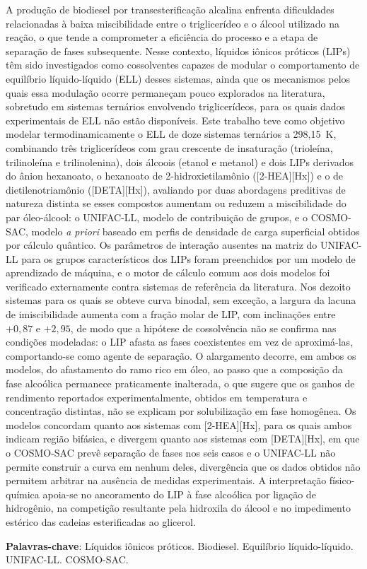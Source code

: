 \setlength{\absparsep}{18pt} %
\begin{resumo}
 
A produção de biodiesel por transesterificação alcalina enfrenta dificuldades relacionadas à baixa miscibilidade entre o triglicerídeo e o álcool utilizado na reação, o que tende a comprometer a eficiência do processo e a etapa de separação de fases subsequente. Nesse contexto, líquidos iônicos próticos (LIPs) têm sido investigados como cossolventes capazes de modular o comportamento de equilíbrio líquido-líquido (ELL) desses sistemas, ainda que os mecanismos pelos quais essa modulação ocorre permaneçam pouco explorados na literatura, sobretudo em sistemas ternários envolvendo triglicerídeos, para os quais dados experimentais de ELL não estão disponíveis. Este trabalho teve como objetivo modelar termodinamicamente o ELL de doze sistemas ternários a 298,15~K, combinando três triglicerídeos com grau crescente de insaturação (trioleína, trilinoleína e trilinolenina), dois álcoois (etanol e metanol) e dois LIPs derivados do ânion hexanoato, o hexanoato de 2-hidroxietilamônio ([2-HEA][Hx]) e o de dietilenotriamônio ([DETA][Hx]), avaliando por duas abordagens preditivas de natureza distinta se esses compostos aumentam ou reduzem a miscibilidade do par óleo-álcool: o UNIFAC-LL, modelo de contribuição de grupos, e o COSMO-SAC, modelo \textit{a priori} baseado em perfis de densidade de carga superficial obtidos por cálculo quântico. Os parâmetros de interação ausentes na matriz do UNIFAC-LL para os grupos característicos dos LIPs foram preenchidos por um modelo de aprendizado de máquina, e o motor de cálculo comum aos dois modelos foi verificado externamente contra sistemas de referência da literatura. Nos dezoito sistemas para os quais se obteve curva binodal, sem exceção, a largura da lacuna de imiscibilidade aumenta com a fração molar de LIP, com inclinações entre $+0{,}87$ e $+2{,}95$, de modo que a hipótese de cossolvência não se confirma nas condições modeladas: o LIP afasta as fases coexistentes em vez de aproximá-las, comportando-se como agente de separação. O alargamento decorre, em ambos os modelos, do afastamento do ramo rico em óleo, ao passo que a composição da fase alcoólica permanece praticamente inalterada, o que sugere que os ganhos de rendimento reportados experimentalmente, obtidos em temperatura e concentração distintas, não se explicam por solubilização em fase homogênea. Os modelos concordam quanto aos sistemas com [2-HEA][Hx], para os quais ambos indicam região bifásica, e divergem quanto aos sistemas com [DETA][Hx], em que o COSMO-SAC prevê separação de fases nos seis casos e o UNIFAC-LL não permite construir a curva em nenhum deles, divergência que os dados obtidos não permitem arbitrar na ausência de medidas experimentais. A interpretação físico-química apoia-se no ancoramento do LIP à fase alcoólica por ligação de hidrogênio, na competição resultante pela hidroxila do álcool e no impedimento estérico das cadeias esterificadas ao glicerol.
 
\vspace{\onelineskip}
\noindent
\textbf{Palavras-chave}: Líquidos iônicos próticos. Biodiesel. Equilíbrio líquido-líquido. UNIFAC-LL. COSMO-SAC.
 
\end{resumo}